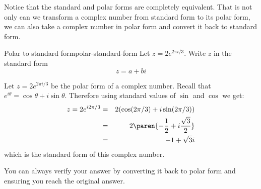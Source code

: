 Notice that the standard and polar forms are completely equivalent. That is not only can we transform a complex number from standard form
to its polar form, we can also take a complex number in polar form and
convert it back to standard form.

\begin{example}{Polar to standard form}{polar-standard-form}
Let $z = 2 e^{ 2\pi i/3}$. Write $z$ in the standard form
\begin{equation*}
z = a+bi
\end{equation*}
\end{example}

\begin{solution}
Let $z = 2 e^{2\pi i/3}$ be the polar form of a complex number. Recall that
$e^{i\theta} = \cos \theta + i \sin \theta$. Therefore using standard values of $\sin$ and $\cos$ we get:
\begin{eqnarray*}
z = 2 e^{i 2\pi/3} &=& 2 (\cos (2\pi/3)+i\sin (2\pi/3))\\
&=& 2 \paren{-\frac{1}{2} + i \frac{\sqrt{3}}{2}} \\
&=&-1 + \sqrt{3}i
\end{eqnarray*}
which is the standard form of this complex number.
\end{solution}

You can always verify your answer by converting it back to polar form and ensuring you reach the original answer.
